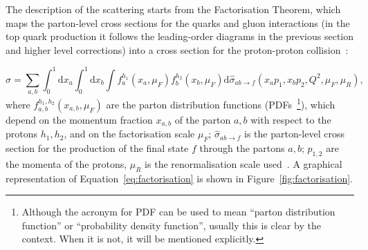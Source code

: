 The description of the scattering
starts from the Factorisation Theorem, which maps the parton-level cross sections for the quarks and gluon interactions (in the top quark production it
follows the leading-order diagrams in the previous section and higher level corrections) into a cross section for the proton-proton collision~\cite{lhc_event_gen}:

\begin{equation}
\displaystyle
\sigma = \sum_{a,b} \int_0^1 \mathrm{d}x_a \int_0^1 \mathrm{d}x_b \int f_a^{h_1}(x_a, \mu_F) f_b^{h_2}(x_b, \mu_F) \textrm{d}\hat{\sigma}_{ab \rightarrow f} (x_a p_1, x_b p_2, Q^2, \mu_F, \mu_R),
\label{eq:factorisation}
\end{equation}
where $f_{a,b}^{h_1,h_2}(x_{a,b}, \mu_F)$ are the parton distribution functions (PDFs~\footnote{Although the acronym for PDF can be used to mean ``parton distribution function''
or ``probability density function'', usually this is clear by the context. When it is not, it will be mentioned explicitly.}), which depend on the momentum fraction $x_{a,b}$
of the parton $a,b$ with respect to the protons $h_1,h_2$, and on the factorisation scale $\mu_F$; $\hat{\sigma}_{ab \rightarrow f}$ is the parton-level cross section for the production
of the final state $f$ through the partons $a,b$; $p_{1,2}$ are the momenta of the protons,
$\mu_R$ is the renormalisation scale used~\cite{qft}. A graphical representation of Equation~\ref{eq:factorisation} is shown in Figure~\ref{fig:factorisation}.

